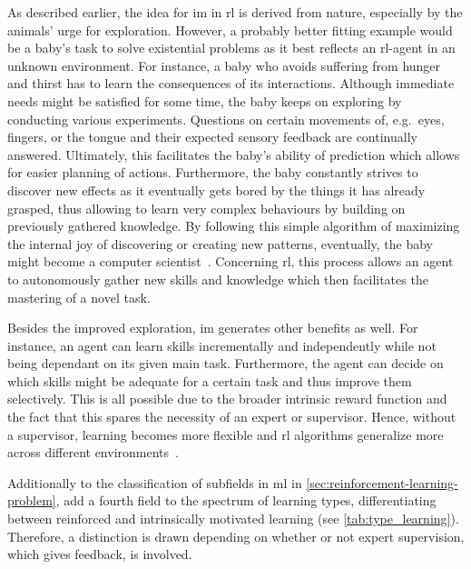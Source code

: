 \documentclass[draft,final]{vutinfth} %
\begin{document}
    As described earlier, the idea for \gls{im} in \gls{rl} is derived from nature, especially by the animals' urge for exploration.
    However, a probably better fitting example would be a baby's task to solve existential problems as it best reflects an \gls{rl}-agent in an unknown environment.
    For instance, a baby who avoids suffering from hunger and thirst has to learn the consequences of its interactions.
    Although immediate needs might be satisfied for some time, the baby keeps on exploring by conducting various experiments.
    Questions on certain movements of, e.g.\ eyes, fingers, or the tongue and their expected sensory feedback are continually answered.
    Ultimately, this facilitates the baby's ability of prediction which allows for easier planning of actions.
    Furthermore, the baby constantly strives to discover new effects as it eventually gets bored by the things it has already grasped, thus allowing to learn very complex behaviours by building on previously gathered knowledge.
    By following this simple algorithm of maximizing the internal joy of discovering or creating new patterns, eventually, the baby might become a computer scientist~\citep{schmidhuber_formal_2010}.
    Concerning \gls{rl}, this process allows an agent to autonomously gather new skills and knowledge which then facilitates the mastering of a novel task.

    Besides the improved exploration, \gls{im} generates other benefits as well.
    For instance, an agent can learn skills incrementally and independently while not being dependant on its given main task.
    Furthermore, the agent can decide on which skills might be adequate for a certain task and thus improve them selectively.
    This is all possible due to the broader intrinsic reward function and the fact that this spares the necessity of an expert or supervisor.
    Hence, without a supervisor, learning becomes more flexible and \gls{rl} algorithms generalize more across different environments~\citep{aubret_survey_2019}.

    Additionally to the classification of subfields in \gls{ml} in \autoref{sec:reinforcement-learning-problem}, \citeauthor{aubret_survey_2019} add a fourth field to the spectrum of learning types, differentiating between reinforced and intrinsically motivated learning (see \autoref{tab:type_learning}).
    Therefore, a distinction is drawn depending on whether or not expert supervision, which gives feedback, is involved.
\end{document}
